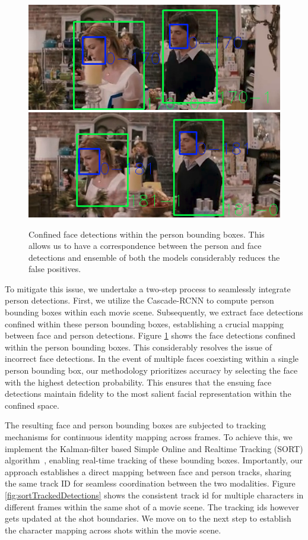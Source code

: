\begin{figure}[t]
\centering
\includegraphics[width=0.49\linewidth]{Figures/faceInsidePersonBox_1.png}
\includegraphics[width=0.49\linewidth]{Figures/faceInsidePersonBox_2.png}
\vspace{-2mm}
\caption{Confined face detections within the person bounding boxes. This allows us to have a correspondence between the person and face detections and ensemble of both the models considerably reduces the false positives.}
\vspace{-4mm}
\label{fig:facesInsidePersonBox}
\end{figure}

To mitigate this issue, we undertake a two-step process to seamlessly integrate person detections. First, we utilize the Cascade-RCNN to compute person bounding boxes within each movie scene. Subsequently, we extract face detections confined within these person bounding boxes, establishing a crucial mapping between face and person detections. Figure \ref{fig:facesInsidePersonBox} shows the face detections confined within the person bounding boxes. This considerably resolves the issue of incorrect face detections.
In the event of multiple faces coexisting within a single person bounding box, our methodology prioritizes accuracy by selecting the face with the highest detection probability. This ensures that the ensuing face detections maintain fidelity to the most salient facial representation within the confined space.

The resulting face and person bounding boxes are subjected to tracking mechanisms for continuous identity mapping across frames. To achieve this, we implement the Kalman-filter based Simple Online and Realtime Tracking (SORT) algorithm~\cite{sort}, enabling real-time tracking of these bounding boxes. Importantly, our approach establishes a direct mapping between face and person tracks, sharing the same track ID for seamless coordination between the two modalities. Figure \ref{fig:sortTrackedDetections} shows the consistent track id for multiple characters in different frames within the same shot of a movie scene. The tracking ids however gets updated at the shot boundaries. We move on to the next step to establish the character mapping across shots within the movie scene.

